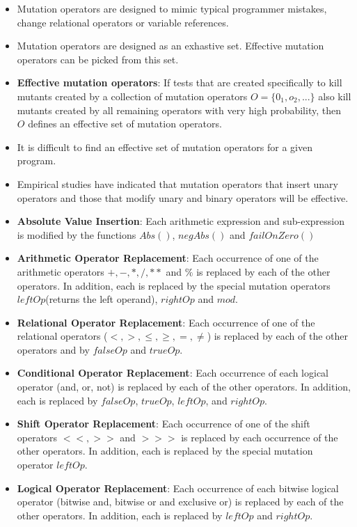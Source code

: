 \documentclass[a4paper]{article}
\begin{document}
\begin{itemize}
    \item Mutation operators are designed to mimic typical programmer mistakes, change relational operators or variable references.
    \item Mutation operators are designed as an exhastive set. Effective mutation operators can be picked from this set.
    \item \textbf{Effective mutation operators}: If tests that are created specifically to kill mutants created by a collection of mutation operators $O=\{0_1,o_2,...\}$ also kill mutants created by all remaining operators with very high probability, then $O$ defines an effective set of mutation operators.
    \item It is difficult to find an effective set of mutation operators for a given program.
    \item Empirical studies have indicated that mutation operators that insert unary operators and those that modify unary and binary operators will be effective.
    \item \textbf{Absolute Value Insertion}: Each arithmetic expression and sub-expression is modified by the functions $Abs()$, $negAbs()$ and $failOnZero()$
    \item \textbf{Arithmetic Operator Replacement}: Each occurrence of one of the arithmetic operators $+,-,*,/,**$ and $\%$ is replaced by each of the other operators. In addition, each is replaced by the special mutation operators $leftOp$(returns the left operand), $rightOp$ and $mod$.
    \item \textbf{Relational Operator Replacement}: Each occurrence of one of the relational operators ($<,>,\leq, \geq, =, \neq$) is replaced by each of the other operators and by $falseOp$ and $trueOp$.
    \item \textbf{Conditional Operator Replacement}: Each occurrence of each logical operator (and, or, not) is replaced by each of the other operators. In addition, each is replaced by $falseOp$, $trueOp$, $leftOp$, and $rightOp$.
    \item \textbf{Shift Operator Replacement}: Each occurrence of one of the shift operators $<<,>>$ and $>>>$ is replaced by each occurrence of the other operators. In addition, each is replaced by the special mutation operator $leftOp$.
    \item \textbf{Logical Operator Replacement}: Each occurrence of each bitwise logical operator (bitwise and, bitwise or and exclusive or) is replaced by each of the other operators. In addition, each is replaced by $leftOp$ and $rightOp$.

\end{itemize}
\end{document}

